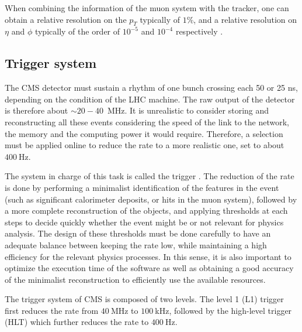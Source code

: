     When combining the information of the muon system with the tracker, one can
    obtain a relative resolution on the $p_T$ typically of $1\%$, and a relative
    resolution on $\eta$ and $\phi$ typically of the order of $10^{-5}$ and $10^{-4}$
    respectively .

    \subsection{Trigger system}

    The CMS detector must sustain a rhythm of one bunch crossing each 50 or 25 ns, depending
    on the condition of the LHC machine. The raw output of the detector is therefore
    about $\sim 20-40$~MHz. It is unrealistic to consider storing and reconstructing all these events
    considering the speed of the link to the network, the memory and the computing power
    it would require. Therefore, a selection must be applied online to reduce the rate
    to a more realistic one, set to about $400~$Hz.

    The system in charge of this task is called the trigger \cite{CMStrigger}. The reduction of the rate
    is done by performing a minimalist identification of the features in the event (such
    as significant calorimeter deposits, or hits in the muon system), followed by a more
    complete reconstruction of the objects, and applying thresholds at each steps to
    decide quickly whether the event might be or not relevant for physics analysis.
    The design of these thresholds must be done carefully to have an adequate balance
    between keeping the rate low, while maintaining a high efficiency for the relevant
    physics processes. In this sense, it is also important to optimize the execution
    time of the software as well as obtaining a good accuracy of the minimalist
    reconstruction to efficiently use the available resources.

    The trigger system of CMS is composed of two levels. The level 1 (L1) trigger first
    reduces the rate from $40~$MHz to $100~$kHz, followed by the high-level trigger (HLT)
    which further reduces the rate to $400~$Hz.


